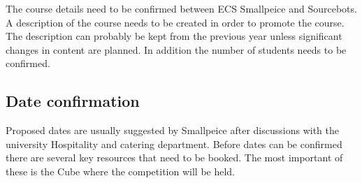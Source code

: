The course details need to be confirmed between ECS Smallpeice and Sourcebots.
A description of the course needs to be created in order to promote the course.
The description can probably be kept from the previous year unless significant changes in content are planned.
In addition the number of students needs to be confirmed.


\subsection{Date confirmation}

Proposed dates are usually suggested by Smallpeice after discussions with the university Hospitality and catering department.
Before dates can be confirmed there are several key resources that need to be booked.
The most important of these is the Cube where the competition will be held.

